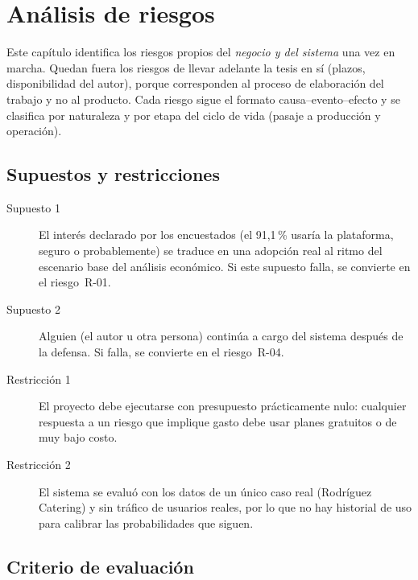 
\chapter{Análisis de riesgos}\label{cap:riesgos}

Este capítulo identifica los riesgos propios del \emph{negocio y del
sistema} una vez en marcha. Quedan fuera los riesgos de llevar adelante
la tesis en sí (plazos, disponibilidad del autor), porque corresponden
al proceso de elaboración del trabajo y no al producto. Cada riesgo
sigue el formato causa--evento--efecto y se clasifica por naturaleza y
por etapa del ciclo de vida (pasaje a producción y operación).

\section{Supuestos y restricciones}

\begin{description}
    \item[Supuesto 1] El interés declarado por los encuestados (el
          91,1\,\% usaría la plataforma, seguro o probablemente) se
          traduce en una adopción real al ritmo del escenario base del
          análisis económico. Si este supuesto falla, se convierte en el
          riesgo~R-01.
    \item[Supuesto 2] Alguien (el autor u otra persona) continúa a cargo
          del sistema después de la defensa. Si falla, se convierte en
          el riesgo~R-04.
    \item[Restricción 1] El proyecto debe ejecutarse con presupuesto
          prácticamente nulo: cualquier respuesta a un riesgo que
          implique gasto debe usar planes gratuitos o de muy bajo costo.
    \item[Restricción 2] El sistema se evaluó con los datos de un único
          caso real (Rodríguez Catering) y sin tráfico de usuarios
          reales, por lo que no hay historial de uso para calibrar las
          probabilidades que siguen.
\end{description}

\section{Criterio de evaluación}


